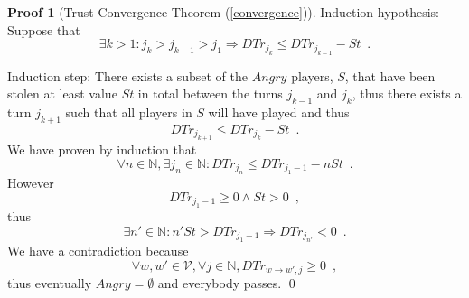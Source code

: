 \documentclass[11pt]{llncs}
\theoremstyle{definition}
\newtheorem*{sepproof}{Proof}
\begin{document}
\begin{sepproof}[Trust Convergence Theorem (\ref{convergence})]
       Induction hypothesis: Suppose that
       \begin{equation*}
          \exists k > 1 : j_k > j_{k-1} > j_1 \Rightarrow DTr_{j_k} \leq DTr_{j_{k-1}} - St \enspace.
       \end{equation*}

       Induction step: There exists a subset of the $Angry$ players, $S$, that have been stolen at least value $St$ in total
       between the turns $j_{k-1}$ and $j_k$, thus there exists a turn $j_{k+1}$ such that all players in $S$ will have
       played and thus
       \begin{equation*}
          DTr_{j_{k+1}} \leq DTr_{j_k} - St \enspace.
       \end{equation*}
       We have proven by induction that
       \begin{equation*}
          \forall n \in \mathbb{N}, \exists j_n \in \mathbb{N} : DTr_{j_n} \leq DTr_{j_1-1} - nSt \enspace.
       \end{equation*}
       However
       \begin{equation*}
          DTr_{j_1-1} \geq 0 \wedge St > 0 \enspace,
       \end{equation*}
       thus
       \begin{equation*}
          \exists n' \in \mathbb{N} : n'St > DTr_{j_1-1} \Rightarrow DTr_{j_{n'}} < 0 \enspace.
       \end{equation*}
       We have a contradiction because
       \begin{equation*}
          \forall w,w' \in \mathcal{V}, \forall j \in \mathbb{N}, DTr_{w \rightarrow w', j} \geq 0 \enspace,
       \end{equation*}
       thus eventually $Angry = \emptyset$ and everybody passes. \qed
    \end{sepproof}
\end{document}
